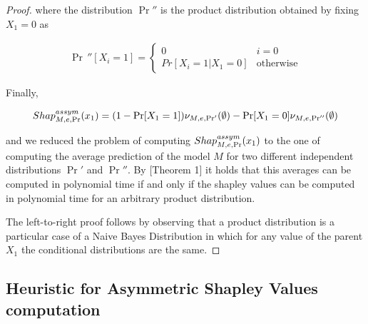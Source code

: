 \begin{proof}
    where the distribution $\Pr''$ is the product distribution obtained by fixing $X_1 = 0$ as

    \begin{align*}
        \Pr \, ''[X_i = 1] = \begin{cases}
            0 & i = 0\\
            Pr[X_i = 1 | X_1 = 0] & \text{otherwise}
        \end{cases}
    \end{align*}

    Finally,

    \begin{align*}
        Shap^{assym}_{M,e,\Pr}(x_1) = (1 - \Pr[X_1 = 1]) \nu_{M,e,\Pr'}(\emptyset) - \Pr[X_1 = 0] \nu_{M,e,\Pr''}(\emptyset)
    \end{align*}

    and we reduced the problem of computing $Shap^{assym}_{M,e,\Pr}(x_1)$ to the one of computing the average prediction of the model $M$ for two different independent distributions $\Pr'$ and $\Pr''$. By \cite{van2022tractability}[Theorem 1] it holds that this averages can be computed in polynomial time if and only if the shapley values can be computed in polynomial time for an arbitrary product distribution.

    The left-to-right proof follows by observing that a product distribution is a particular case of a Naive Bayes Distribution in which for any value of the parent $X_1$ the conditional distributions are the same.
    
    
\end{proof}

\subsection{Heuristic for Asymmetric Shapley Values computation}
\label{heuristic_asv_section}